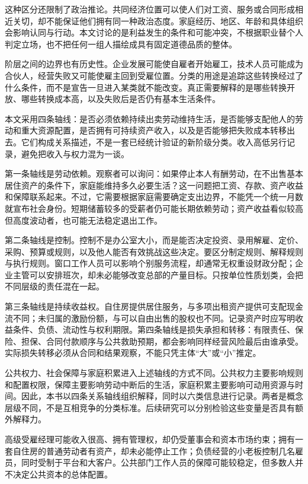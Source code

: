 \documentclass[UTF8,fontset=fandol,zihao=-4,oneside,openany]{ctexbook}
\begin{document}
这种区分还限制了政治推论。共同经济位置可以使人们对工资、服务或合同形成相近关切，却不能保证他们拥有同一种政治态度。家庭经历、地区、年龄和具体组织会影响认同与行动。本文讨论的是利益发生的条件和可能冲突，不根据职业替个人判定立场，也不把任何一组人描绘成具有固定道德品质的整体。

阶层之间的边界也有历史性。企业发展可能使自雇者开始雇工，技术人员可能成为合伙人，经营失败又可能使雇主回到受雇位置。分类的用途是追踪这些转换经过了什么条件，而不是宣告一旦进入某类就不能改变。真正需要解释的是哪些转换开放、哪些转换成本高，以及失败后是否仍有基本生活条件。

本文采用四条轴线：是否必须依赖持续出卖劳动维持生活，是否能够支配他人的劳动和重大资源配置，是否拥有可持续资产收入，以及是否能够把失败成本转移出去。它们构成关系描述，不是一套已经统计验证的新阶级分类。收入高低另行记录，避免把收入与权力混为一谈。

\label{arg:P172}
第一条轴线是劳动依赖。观察者可以询问：如果停止本人有酬劳动，在不出售基本居住资产的条件下，家庭能维持多久必要生活？这一问题把工资、存款、资产收益和保障联系起来。不过，它需要根据家庭需要确定支出边界，不能凭一个统一月数就宣布社会身份。短期储蓄较多的受薪者仍可能长期依赖劳动；资产收益看似较高但高度波动者，也可能无法稳定退出工作。

第二条轴线是控制。控制不是办公室大小，而是能否决定投资、录用解雇、定价、采购、预算或规则，以及他人能否有效挑战这些决定。要区分制定规则、解释规则与执行规则。窗口工作人员可以影响个别服务流程，却通常无权重设财政分配；企业主管可以安排班次，却未必能够改变总部的产量目标。只按单位性质划类，会把不同层级的责任混在一起。

第三条轴线是持续收益权。自住房提供居住服务，与多项出租资产提供可支配现金流不同；未归属的激励份额，与可以自由出售的股权也不同。记录资产时应写明收益条件、负债、流动性与权利期限。第四条轴线是损失承担和转移：有限责任、保险、担保、合同付款顺序与公共救助预期，都会影响同样经营风险最后由谁承受。实际损失转移必须从合同和结果观察，不能只凭主体“大”或“小”推定。

公共权力、社会保障与家庭积累进入上述轴线的方式不同。公共权力主要影响规则和配置权限，保障主要影响劳动中断后的生活，家庭积累主要影响可动用资源与时间。因此，本书以四条关系轴线组织解释，同时以六类信息进行记录。两者是概念层级不同，不是互相竞争的分类标准。后续研究可以分别检验这些变量是否具有额外解释力。

高级受雇经理可能收入很高、拥有管理权，却仍受董事会和资本市场约束；拥有一套自住房的普通劳动者有资产，却未必能停止工作；负债经营的小老板控制几名雇员，同时受制于平台和大客户。公共部门工作人员的保障可能较稳定，但多数人并不决定公共资本的总体配置。
\end{document}
